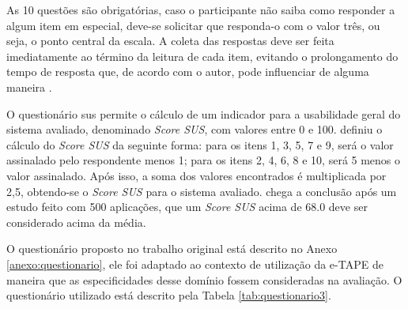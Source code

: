 \par
 As 10 questões são obrigatórias, caso o participante não saiba como responder a algum item em especial, deve-se solicitar que responda-o com o valor três, ou seja, o ponto central da escala. A coleta das respostas 
deve ser feita imediatamente ao término da leitura de cada item, evitando o prolongamento do tempo de resposta que, de acordo com o autor, pode influenciar de alguma maneira \cite{brooke1996sus}.

\par

O questionário \acrshort{sus} permite o cálculo de um indicador para a usabilidade geral do sistema avaliado, denominado \textit{Score SUS}, com valores entre 0 e 100. 
 definiu o cálculo do \textit{Score SUS} da seguinte forma:
para os itens 1, 3, 5, 7 e 9, será o valor assinalado pelo respondente menos 1; para os itens 2, 4, 6, 8 e 10, será 5 menos o valor assinalado. Após isso, a soma dos valores 
encontrados é multiplicada por 2,5, obtendo-se o \textit{Score SUS} para o sistema avaliado.  chega a conclusão após um estudo feito com 500 aplicações, 
que um \textit{Score SUS} acima de 68.0 deve ser considerado acima da média.

\par
O questionário proposto no trabalho original está descrito no Anexo \ref{anexo:questionario}, ele foi adaptado ao contexto de utilização da e-TAPE de maneira que as especificidades desse domínio fossem consideradas na avaliação. 
O questionário utilizado está descrito pela Tabela \ref{tab:questionario3}.

